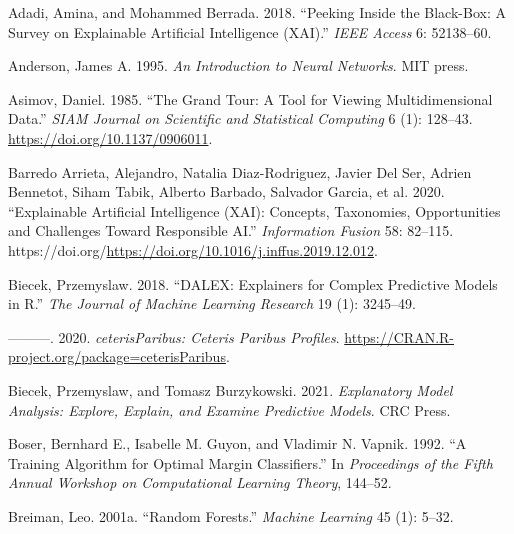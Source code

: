 \documentclass[
]{article}
\newlength{\cslhangindent}
\newlength{\cslentryspacingunit} %
\newenvironment{CSLReferences}[2] %
 {%
  \setlength{\parindent}{0pt}
  \ifodd #1
  \let\oldpar\par
  \def\par{\hangindent=\cslhangindent\oldpar}
  \fi
  \setlength{\parskip}{#2\cslentryspacingunit}
 }%
 {}
\begin{document}
\hypertarget{refs}{}
\begin{CSLReferences}{1}{0}
\leavevmode{}%
Adadi, Amina, and Mohammed Berrada. 2018. {``Peeking Inside the Black-Box: A Survey on Explainable Artificial Intelligence ({XAI}).''} \emph{IEEE Access} 6: 52138--60.

\leavevmode{}%
Anderson, James A. 1995. \emph{An Introduction to Neural Networks}. MIT press.

\leavevmode{}%
Asimov, Daniel. 1985. {``The {Grand} {Tour}: A {Tool} for {Viewing} {Multidimensional} {Data}.''} \emph{SIAM Journal on Scientific and Statistical Computing} 6 (1): 128--43. \url{https://doi.org/10.1137/0906011}.

\leavevmode{}%
Barredo Arrieta, Alejandro, Natalia Diaz-Rodriguez, Javier Del Ser, Adrien Bennetot, Siham Tabik, Alberto Barbado, Salvador Garcia, et al. 2020. {``Explainable Artificial Intelligence (XAI): Concepts, Taxonomies, Opportunities and Challenges Toward Responsible AI.''} \emph{Information Fusion} 58: 82--115. https://doi.org/\url{https://doi.org/10.1016/j.inffus.2019.12.012}.

\leavevmode{}%
Biecek, Przemyslaw. 2018. {``{DALEX}: Explainers for Complex Predictive Models in {R}.''} \emph{The Journal of Machine Learning Research} 19 (1): 3245--49.

\leavevmode{}%
---------. 2020. \emph{{ceterisParibus}: {Ceteris} {Paribus} {Profiles}}. \url{https://CRAN.R-project.org/package=ceterisParibus}.

\leavevmode{}%
Biecek, Przemyslaw, and Tomasz Burzykowski. 2021. \emph{Explanatory {Model} {Analysis}: {Explore}, {Explain}, and {Examine} {Predictive} {Models}}. CRC Press.

\leavevmode{}%
Boser, Bernhard E., Isabelle M. Guyon, and Vladimir N. Vapnik. 1992. {``A Training Algorithm for Optimal Margin Classifiers.''} In \emph{Proceedings of the Fifth Annual Workshop on {Computational} Learning Theory}, 144--52.

\leavevmode{}%
Breiman, Leo. 2001a. {``Random Forests.''} \emph{Machine Learning} 45 (1): 5--32.


\end{CSLReferences}
\end{document}
